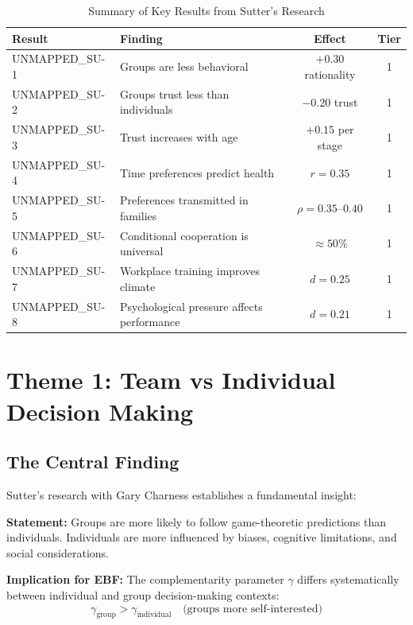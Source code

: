 \begin{table}[htbp]
\centering
\caption{Summary of Key Results from Sutter's Research}
\label{tab:su-key-results}
\renewcommand{\arraystretch}{1.3}
\begin{tabular}{@{}llcc@{}}
\toprule
\textbf{Result} & \textbf{Finding} & \textbf{Effect} & \textbf{Tier} \\
\midrule
UNMAPPED_SU-1 & Groups are less behavioral & $+0.30$ rationality & 1 \\
UNMAPPED_SU-2 & Groups trust less than individuals & $-0.20$ trust & 1 \\
UNMAPPED_SU-3 & Trust increases with age & $+0.15$ per stage & 1 \\
UNMAPPED_SU-4 & Time preferences predict health & $r = 0.35$ & 1 \\
UNMAPPED_SU-5 & Preferences transmitted in families & $\rho = 0.35$--$0.40$ & 1 \\
UNMAPPED_SU-6 & Conditional cooperation is universal & $\approx 50\%$ & 1 \\
UNMAPPED_SU-7 & Workplace training improves climate & $d = 0.25$ & 1 \\
UNMAPPED_SU-8 & Psychological pressure affects performance & $d = 0.21$ & 1 \\
\bottomrule
\end{tabular}
\end{table}


\section{Theme 1: Team vs Individual Decision Making}
\label{sec:su-team}

\subsection{The Central Finding}
\label{sec:su-groupind}

Sutter's research with Gary Charness \citep{charness2012groups} establishes a fundamental insight:

\begin{tcolorbox}[colback=green!5!white, colframe=green!75!black,
    title=Key Result UNMAPPED_SU-1: Groups are Less Behavioral]
\textbf{Statement:} Groups are more likely to follow game-theoretic predictions than individuals. Individuals are more influenced by biases, cognitive limitations, and social considerations.

\textbf{Implication for EBF:} The complementarity parameter $\gamma$ differs systematically between individual and group decision-making contexts:
\begin{equation}
\gamma_{\text{group}} > \gamma_{\text{individual}} \quad \text{(groups more self-interested)}
\end{equation}
\end{tcolorbox}

